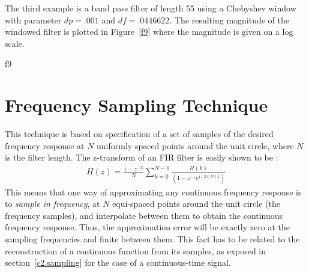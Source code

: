 	The third example is a band pass filter of length 55
using a Chebyshev window with parameter $dp=.001$ and $df=.0446622$.  The resulting
magnitude of the windowed filter is plotted in Figure~\ref{f9} where
the magnitude is given on a log scale.
%

{f9}
%


\section{Frequency Sampling Technique}

This technique is based on specification of a set of samples
of the desired frequency response at $N$ uniformly spaced points around the unit circle, where $N$ is the filter length.
The z-transform of an FIR filter is easily shown to be :
\begin{eqnarray}
H(z)=\frac{1-z^{-N}}{N}\sum_{k=0}^{N-1}\frac{H(k)}{(1-z^{-1}e^{j(2\pi/N)k})}
\label{e.fs.1}
\end{eqnarray}
This means that one way of approximating any continuous frequency
response is to {\em sample in frequency}, at $N$ equi-spaced points around the 
unit circle (the frequency samples), and interpolate between them to obtain
the continuous frequency response. Thus, the approximation error will
be exactly zero at the sampling frequencies and finite between them.
This fact has to be related to the reconstruction of a continuous
function from its samples, as exposed in section~\ref{c2.sampling} 
for the case of a continuous-time signal.

